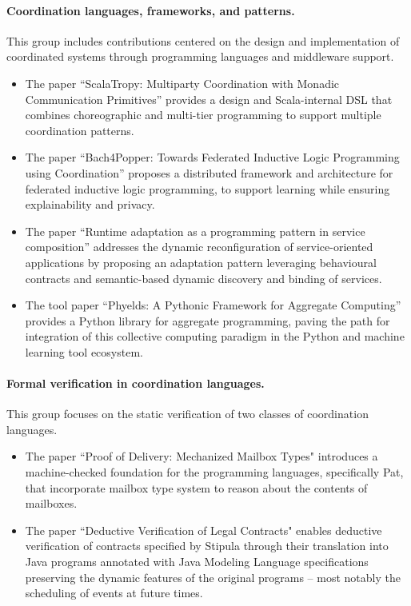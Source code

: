 \documentclass[]{llncs}
\begin{document}
\paragraph{Coordination languages, frameworks, and patterns.}
This group includes contributions centered on the design and implementation of coordinated systems through programming languages and middleware support.
\begin{itemize}
\item 	The paper ``ScalaTropy: Multiparty Coordination with Monadic Communication Primitives'' provides a design and Scala-internal DSL that combines choreographic and multi-tier programming to support multiple coordination patterns.
\item The paper ``Bach4Popper: Towards Federated Inductive Logic Programming using Coordination'' proposes a distributed framework and architecture for federated inductive logic programming, to support learning while ensuring explainability and privacy.
\item The paper ``Runtime adaptation as a programming pattern in service composition'' addresses the dynamic reconfiguration of service-oriented applications by proposing an adaptation pattern leveraging behavioural contracts and semantic-based dynamic discovery and binding of services.
\item The tool paper ``Phyelds: A Pythonic Framework for Aggregate Computing'' provides a Python library for aggregate programming, paving the path for integration of this collective computing paradigm in the Python and machine learning tool ecosystem.
\end{itemize}


\paragraph{Formal verification in coordination languages.}
%
This group focuses on the static verification of two classes of coordination languages. 
\begin{itemize}
\item The paper ``Proof of Delivery: Mechanized Mailbox Types" introduces a machine-checked foundation for the programming languages, specifically Pat, that incorporate mailbox type system to reason about the contents of mailboxes. 
\item The paper ``Deductive Verification of Legal Contracts" enables deductive verification of contracts specified by Stipula through their translation into Java programs annotated with Java 
	Modeling Language specifications preserving the dynamic
	features of the original programs – most notably the scheduling of events at future times.
\end{itemize}
\end{document}

